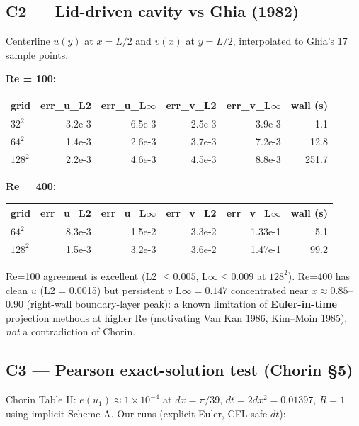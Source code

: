 \documentclass[11pt]{article}
\begin{document}
\subsection{C2 --- Lid-driven cavity vs Ghia (1982)}

Centerline $u(y)$ at $x=L/2$ and $v(x)$ at $y=L/2$, interpolated to Ghia's 17 sample points.

\textbf{Re = 100:}
\begin{center}
\begin{tabular}{@{}lrrrrr@{}}
\toprule
grid & err\_u\_L2 & err\_u\_L$\infty$ & err\_v\_L2 & err\_v\_L$\infty$ & wall (s) \\
\midrule
$32^2$   & 3.2e-3 & 6.5e-3 & 2.5e-3 & 3.9e-3 & 1.1 \\
$64^2$   & 1.4e-3 & 2.6e-3 & 3.7e-3 & 7.2e-3 & 12.8 \\
$128^2$  & 2.2e-3 & 4.6e-3 & 4.5e-3 & 8.8e-3 & 251.7 \\
\bottomrule
\end{tabular}
\end{center}

\textbf{Re = 400:}
\begin{center}
\begin{tabular}{@{}lrrrrr@{}}
\toprule
grid & err\_u\_L2 & err\_u\_L$\infty$ & err\_v\_L2 & err\_v\_L$\infty$ & wall (s) \\
\midrule
$64^2$   & 8.3e-3 & 1.5e-2 & 3.3e-2 & 1.33e-1 & 5.1 \\
$128^2$  & 1.5e-3 & 3.2e-3 & 3.6e-2 & 1.47e-1 & 99.2 \\
\bottomrule
\end{tabular}
\end{center}

Re=100 agreement is excellent (L2 $\le 0.005$, L$\infty \le 0.009$ at $128^2$). Re=400 has clean $u$ (L2 = 0.0015) but persistent $v$ L$\infty = 0.147$ concentrated near $x\approx 0.85$--$0.90$ (right-wall boundary-layer peak): a known limitation of \textbf{Euler-in-time} projection methods at higher Re (motivating Van Kan 1986, Kim--Moin 1985), \emph{not} a contradiction of Chorin.

\subsection{C3 --- Pearson exact-solution test (Chorin \S 5)}

Chorin Table II: $e(u_1) \approx 1\times 10^{-4}$ at $dx=\pi/39$, $dt = 2dx^2 = 0.01397$, $R=1$ using implicit Scheme A. Our runs (explicit-Euler, CFL-safe $dt$):
\end{document}
